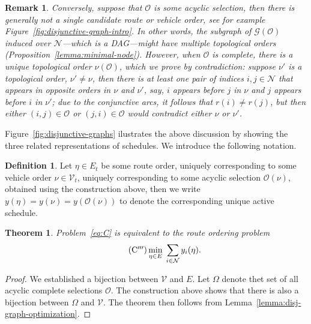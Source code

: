 \documentclass[a4paper]{report}
\theoremstyle{definition}
\newtheorem{define}{Definition}[chapter]
\theoremstyle{plain}
\newtheorem{theorem}{Theorem}[chapter]
\newtheorem{remarknum}{Remark}[chapter]
\begin{document}
\begin{remarknum}\label{rem:partial-order}
Conversely, suppose that $\mathcal{O}$ is some acyclic selection, then there is
generally not a single candidate route or vehicle order, see for example
Figure~\ref{fig:disjunctive-graph-intro}.
%
In other words, the subgraph of $\mathcal{G}(\mathcal{O})$ induced over
$\mathcal{N}$---which is a DAG---might have multiple topological orders
(Proposition~\ref{lemma:minimal-node}).
%
However, when $\mathcal{O}$ is complete, there is a unique topological order
$\nu(\mathcal{O})$, which we prove by contradiction: suppose $\nu'$ is a
topological order, $\nu' \neq \nu$, then there is at least one pair of indices
$i,j \in \mathcal{N}$ that appears in opposite orders in $\nu$ and $\nu'$, say,
$i$ appears before $j$ in $\nu$ and $j$ appears before $i$ in $\nu'$; due to the
conjunctive arcs, it follows that $r(i) \neq r(j)$, but then either
$(i,j) \in \mathcal{O}$ or $(j,i) \in \mathcal{O}$ would contradict either $\nu$
or $\nu'$.
\end{remarknum}

Figure~\ref{fig:disjunctive-graphs} ilustrates the above discussion by showing the three related
representations of schedules.
%
We introduce the following notation.

\begin{define}\label{def:orders}
  Let $\eta \in E_t$ be some route order, uniquely corresponding to some vehicle
  order $\nu \in \mathcal{V}_t$, uniquely corresponding to some acyclic
  selection $\mathcal{O}(\nu)$, obtained using the construction above, then we
  write $y(\eta) = y(\nu) = y(\mathcal{O}(\nu))$ to denote the corresponding unique
  active schedule.
\end{define}

\begin{theorem}
  Problem~\eqref{eq:C} is equivalent to the \emph{route ordering problem}
  \begin{align}\label{eq:RO}
    \tag{$\mathrm{C}^{\prime\prime\prime}$}
    \min_{\eta \in E} \; \sum_{i \in \mathcal{N}} y_i(\eta) .
  \end{align}
\end{theorem}
\begin{proof}
  We established a bijection between $\mathcal{V}$ and $E$. Let $\Omega$ denote thet
  set of all acyclic complete selections $\mathcal{O}$. The construction above
  shows that there is also a bijection between $\Omega$ and $\mathcal{V}$.
  The theorem then follows from Lemma~\ref{lemma:disj-graph-optimization}.
\end{proof}
\end{document}
